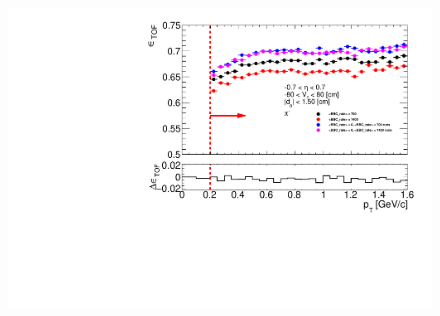 \begin{figure}[hb]
{		\includegraphics[width=\linewidth,page=2]{graphics/systematicsEfficiency/bbc_and/tofEffi_d0_1_5_etapt_1.pdf}\\
	}%
\end{figure}
